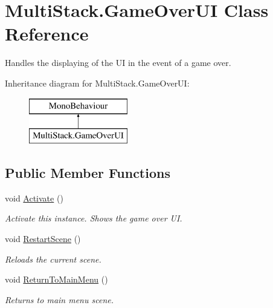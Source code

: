 \hypertarget{class_multi_stack_1_1_game_over_u_i}{}\section{Multi\+Stack.\+Game\+Over\+U\+I Class Reference}
\label{class_multi_stack_1_1_game_over_u_i}


Handles the displaying of the U\+I in the event of a game over.  


Inheritance diagram for Multi\+Stack.\+Game\+Over\+U\+I\+:\begin{figure}[H]
\begin{center}
\leavevmode
\includegraphics[height=2.000000cm]{class_multi_stack_1_1_game_over_u_i}
\end{center}
\end{figure}
\subsection*{Public Member Functions}
\begin{DoxyCompactItemize}
\item 
void \hyperlink{class_multi_stack_1_1_game_over_u_i_a551012fc4da6e0ab26ec36769f890d3e}{Activate} ()
\begin{DoxyCompactList}\small\item\em Activate this instance. Shows the game over U\+I. \end{DoxyCompactList}\item 
void \hyperlink{class_multi_stack_1_1_game_over_u_i_ab330768d714499d49e51f6a0fa37a828}{Restart\+Scene} ()
\begin{DoxyCompactList}\small\item\em Reloads the current scene. \end{DoxyCompactList}\item 
void \hyperlink{class_multi_stack_1_1_game_over_u_i_a7262bfc9da8aa5c0c48bfc0d2bc6286b}{Return\+To\+Main\+Menu} ()
\begin{DoxyCompactList}\small\item\em Returns to main menu scene. \end{DoxyCompactList}\end{DoxyCompactItemize}
